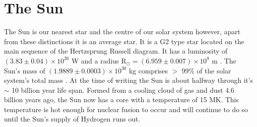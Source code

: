 \section{The Sun}
The Sun is our nearest star and the centre of our solar system however, apart from these distinctions it is an average star. It is a G2 type star located on the main sequence of the Hertzsprung Russell diagram. It has a luminosity of $(3.83 \pm 0.04) \times 10^{26}$ W and a radius R$_\odot = (6.959 \pm 0.007) \times 10^8$ m \citep{Foukal2004}. The Sun's mass of $(1.9889 \pm 0.0003) \times 10^{30}$ kg comprises $>$ 99\% of the solar system's total mass \citep{Foukal2004}. At the time of writing the Sun is about halfway through it's $\sim$ 10 billion year life span. Formed from a cooling cloud of gas and dust 4.6 billion years ago, the Sun now has a core with a temperature of 15 MK. This temperature is hot enough for nuclear fusion to occur and will continue to do so until the Sun's supply of Hydrogen runs out. %

